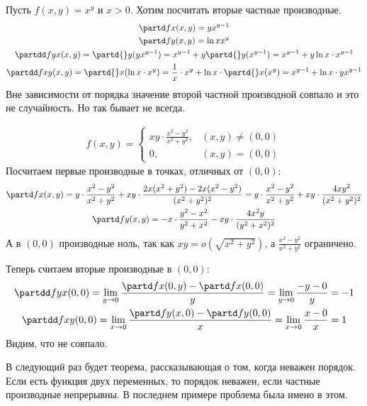 \begin{exmp}
  Пусть $f(x, y) = x^y$ и $x>0$.
  Хотим посчитать вторые частные производные.
	\begin{gather*}
	\partd f x (x, y) = yx^{y-1} \\
	\partd f y (x, y) = \ln x x^y \\
	\partdd f y x (x, y) = \partd{}y(yx^{y-1}) = x^{y-1}+y\partd{}y(x^{y-1}) = x^{y-1}+y\ln x \cdot x^{y-1} \\
	\partdd f x y (x, y) = \partd{}x(\ln x \cdot x^y) = \frac 1 x \cdot x^y + \ln x \cdot \partd{}x(x^y) = x^{y-1}+\ln x \cdot yx^{y-1}
	\end{gather*}
	Вне зависимости от порядка значение второй частной производной совпало и это не случайность.
	Но так бывает не всегда.
\end{exmp}
\begin{exmp}
	\begin{gather*}
	f(x, y) =
		\begin{cases}
			xy \cdot \frac{x^2-y^2}{x^2+y^2}, & (x, y) \ne (0, 0) \\
			0, & (x, y) = (0, 0)
		\end{cases}
	\end{gather*}
	Посчитаем первые производные в точках, отличных от $(0, 0)$:
	\begin{gather*}
	\partd f x (x, y) = y \cdot \frac{x^2-y^2}{x^2+y^2} + xy \cdot \frac{2x(x^2+y^2)-2x(x^2-y^2)}{(x^2+y^2)^2}
	                  = y \cdot \frac{x^2-y^2}{x^2+y^2} + xy \cdot \frac{4xy^2}{(x^2+y^2)^2} \\
	\partd f y (x, y) = -x \cdot \frac{y^2-x^2}{y^2+x^2} - xy \cdot \frac{4x^2y}{(y^2+x^2)^2}
	\end{gather*}
	А в $(0, 0)$ производные ноль, так как $xy=o(\sqrt{x^2+y^2})$, а $\frac{x^2-y^2}{x^2+y^2}$ ограничено.

	Теперь считаем вторые производные в $(0, 0)$:
	\begin{gather*}
	\partdd f y x (0, 0) = \lim_{y\to 0} \frac{\partd f x (0, y) - \partd f x (0, 0)}{y}
	                     = \lim_{y\to 0} \frac{-y - 0}{y} = -1 \\
	\partdd f x y (0, 0) = \lim_{x\to 0} \frac{\partd f y (x, 0) - \partd f y (0, 0)}{x}
	                     = \lim_{x\to 0} \frac{x - 0}{x} = 1 \\
	\end{gather*}
	Видим, что не совпало.
\end{exmp}
\begin{Rem}
	В следующий раз будет теорема, рассказывающая о том, когда неважен порядок.
	Если есть функция двух переменных, то порядок неважен, если частные производные непрерывны.
	В последнем примере проблема была имено в этом.
\end{Rem}
